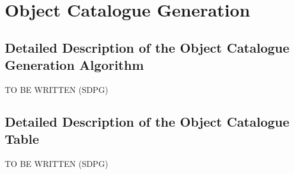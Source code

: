 \section{Object Catalogue Generation}
\label{chap:algorithms:catalogue}

\subsection{Detailed Description of the Object Catalogue Generation Algorithm}
TO BE WRITTEN (SDPG)
\subsection{Detailed Description of the Object Catalogue Table}
TO BE WRITTEN (SDPG)
